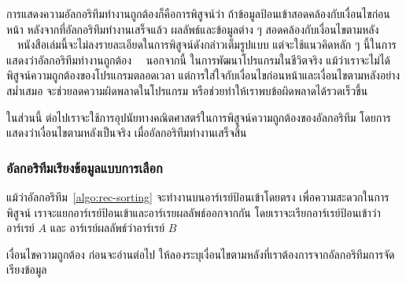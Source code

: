 การ{\wbr}แสดง{\wbr}ความ{\wbr}อัล{\wbr}กอ{\wbr}ริ{\wbr}ทึม{\wbr}ทำงาน{\wbr}ถูกต้อง{\wbr}ก็{\wbr}คือ{\wbr}การ{\wbr}พิสูจน์{\wbr}ว่า{\wbr}
ถ้า{\wbr}ข้อมูล{\wbr}ป้อน{\wbr}เข้า{\wbr}สอดคล้อง{\wbr}กับ{\wbr}เงื่อนไข{\wbr}ก่อนหน้า หลังจาก{\wbr}ที่{\wbr}อัล{\wbr}กอ{\wbr}ริ{\wbr}ทึม{\wbr}ทำงาน{\wbr}เสร็จ{\wbr}แล้ว{\wbr}
ผลลัพธ์{\wbr}และ{\wbr}ข้อมูล{\wbr}ต่าง ๆ สอดคล้อง{\wbr}กับ{\wbr}เงื่อนไข{\wbr}ตาม{\wbr}หลัง{\wbr}
\ \ หนังสือ{\wbr}เล่ม{\wbr}นี้{\wbr}จะ{\wbr}ไม่{\wbr}ลง{\wbr}รายละเอียด{\wbr}ใน{\wbr}การ{\wbr}พิสูจน์{\wbr}ดังกล่าว{\wbr}เต็ม{\wbr}รูปแบบ แต่{\wbr}จะ{\wbr}ใช้{\wbr}แนว{\wbr}คิด{\wbr}หลัก ๆ
นี้{\wbr}ใน{\wbr}การ{\wbr}แสดง{\wbr}ว่า{\wbr}อัล{\wbr}กอ{\wbr}ริ{\wbr}ทึม{\wbr}ทำงาน{\wbr}ถูกต้อง \ \ นอกจากนี้ ใน{\wbr}การ{\wbr}พัฒนา{\wbr}โปรแกรม{\wbr}ใน{\wbr}ชีวิต{\wbr}จริง{\wbr}
แม้ว่า{\wbr}เรา{\wbr}จะ{\wbr}ไม่{\wbr}ได้{\wbr}พิสูจน์{\wbr}ความ{\wbr}ถูกต้อง{\wbr}ของ{\wbr}โปรแกรม{\wbr}ตลอดเวลา{\wbr}
แต่{\wbr}การ{\wbr}ใส่ใจ{\wbr}กับ{\wbr}เงื่อนไข{\wbr}ก่อนหน้า{\wbr}และ{\wbr}เงื่อนไข{\wbr}ตาม{\wbr}หลัง{\wbr}อย่าง{\wbr}สม่ำเสมอ{\wbr}
จะ{\wbr}ช่วย{\wbr}ลด{\wbr}ความผิด{\wbr}พลาด{\wbr}ใน{\wbr}โปรแกรม หรือ{\wbr}ช่วย{\wbr}ทำ{\wbr}ให้{\wbr}เรา{\wbr}พบ{\wbr}ข้อผิดพลาด{\wbr}ได้{\wbr}รวดเร็ว{\wbr}ขึ้น{\wbr}

ใน{\wbr}ส่วน{\wbr}นี้ ต่อไป{\wbr}เรา{\wbr}จะ{\wbr}ใช้{\wbr}การ{\wbr}อุปนัย{\wbr}ทาง{\wbr}คณิตศาสตร์{\wbr}ใน{\wbr}การ{\wbr}พิสูจน์{\wbr}ความ{\wbr}ถูกต้อง{\wbr}ของ{\wbr}อัล{\wbr}กอ{\wbr}ริ{\wbr}ทึม{\wbr}
โดย{\wbr}การ{\wbr}แสดง{\wbr}ว่า{\wbr}เงื่อนไข{\wbr}ตาม{\wbr}หลัง{\wbr}เป็นจริง เมื่อ{\wbr}อัล{\wbr}กอ{\wbr}ริ{\wbr}ทึม{\wbr}ทำงาน{\wbr}เสร็จสิ้น{\wbr}

\subsubsection{อัล{\wbr}กอ{\wbr}ริ{\wbr}ทึม{\wbr}เรียง{\wbr}ข้อมูล{\wbr}แบบ{\wbr}การ{\wbr}เลือก}

แม้ว่า{\wbr}อัล{\wbr}กอ{\wbr}ริ{\wbr}ทึม~\ref{algo:rec-sorting} จะ{\wbr}ทำงาน{\wbr}บน{\wbr}อาร์เรย์{\wbr}ป้อน{\wbr}เข้า{\wbr}โดย{\wbr}ตรง{\wbr}
เพื่อ{\wbr}ความ{\wbr}สะดวก{\wbr}ใน{\wbr}การ{\wbr}พิสูจน์ เรา{\wbr}จะ{\wbr}แยก{\wbr}อาร์เรย์{\wbr}ป้อน{\wbr}เข้า{\wbr}และ{\wbr}อาร์เรย{\wbr}ผลลัพธ์{\wbr}ออก{\wbr}จาก{\wbr}กัน{\wbr}
โดย{\wbr}เรา{\wbr}จะ{\wbr}เรียก{\wbr}อาร์เรย์{\wbr}ป้อน{\wbr}เข้าว่า{\wbr}อาร์เรย์ $A$ และ อาร์เรย์ผลลัพธ์{\wbr}ว่า{\wbr}อาร์เรย์ $B$

\begin{quiz}{เงื่อนไข{\wbr}ความ{\wbr}ถูกต้อง}
ก่อน{\wbr}จะ{\wbr}อ่าน{\wbr}ต่อไป ให้{\wbr}ลอง{\wbr}ระบุ{\wbr}เงื่อนไข{\wbr}ตาม{\wbr}หลัง{\wbr}ที่{\wbr}เรา{\wbr}ต้องการ{\wbr}จาก{\wbr}อัล{\wbr}กอ{\wbr}ริ{\wbr}ทึม{\wbr}การ{\wbr}จัดเรียง{\wbr}ข้อมูล{\wbr}
\end{quiz}


